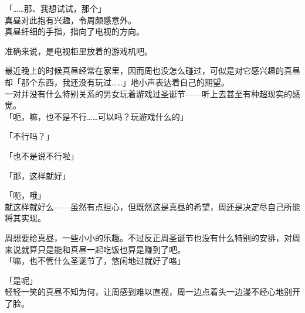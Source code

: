 「……那、我想试试，那个」\\

真昼对此抱有兴趣，令周颇感意外。\\

真昼纤细的手指，指向了电视的方向。

准确来说，是电视柜里放着的游戏机吧。

最近晚上的时候真昼经常在家里，因而周也没怎么碰过，可似是对它感兴趣的真昼却「那个东西，我还没有玩过……」地小声表达着自己的期望。\\

一对并没有什么特别关系的男女玩着游戏过圣诞节——听上去甚至有种超现实的感觉。\\

「呃，嘛，也不是不行……可以吗？玩游戏什么的」

「不行吗？」

「也不是说不行啦」

「那，这样就好」

「呃，哦」\\

就这样就好么——虽然有点担心，但既然这是真昼的希望，周还是决定尽自己所能将其实现。

周想要给真昼，一些小小的乐趣。不过反正周圣诞节也没有什么特别的安排，对周来说就算只是能和真昼一起吃饭也算是赚到了吧。\\

「嘛，也不管什么圣诞节了，悠闲地过就好了咯」

「是呢」\\

轻轻一笑的真昼不知为何，让周感到难以直视，周一边点着头一边漫不经心地别开了脸。
